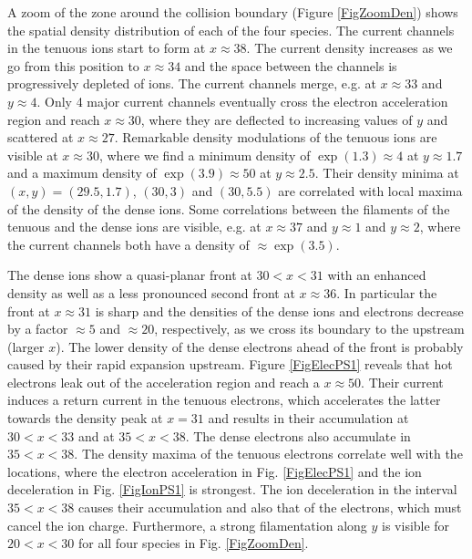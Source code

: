 \documentclass[structabstract]{aa}
\begin{document}
A zoom of the zone around the collision boundary (Figure \ref{FigZoomDen}) 
shows the spatial density distribution of each of the four species. The 
current channels in the tenuous ions start to form at $x\approx 38$. The 
current density increases as we go from this position to $x\approx 34$ and 
the space between the channels is progressively depleted of ions. The current
channels merge, e.g. at $x\approx 33$ and $y \approx 4$. Only 4 major 
current channels eventually cross the electron acceleration region and reach 
$x\approx 30$, where they are deflected to increasing values of $y$ and 
scattered at $x\approx 27$. Remarkable density modulations of the tenuous 
ions are visible at $x\approx 30$, where we find a minimum density of 
$\exp{(1.3)} \approx 4$ at $y\approx 1.7$ and a maximum density of
$\exp{(3.9)} \approx 50$ at $y\approx 2.5$. Their density minima at $(x,y) 
= (29.5,1.7)$, $(30,3)$ and $(30,5.5)$ are correlated with local maxima of 
the density of the dense ions. Some correlations between the filaments of 
the tenuous and the dense ions are visible, e.g. at $x\approx 37$ and 
$y\approx 1$ and $y\approx 2$, where the current channels both have a 
density of $\approx \exp{(3.5)}$. 

The dense ions show a quasi-planar front at $30<x<31$ with an enhanced 
density as well as a less pronounced second front at $x\approx 36$. In 
particular the front at $x\approx 31$ is sharp and the densities of the 
dense ions and electrons decrease by a factor $\approx 5$ and $\approx 20$, 
respectively, as we cross its boundary to the upstream (larger $x$). The 
lower density of the dense electrons ahead of the front is probably caused 
by their rapid expansion upstream. Figure \ref{FigElecPS1} reveals that hot 
electrons leak out of the acceleration region and reach a $x\approx 50$. 
Their current induces a return current in the tenuous electrons, which 
accelerates the latter towards the density peak at $x=31$ and results in 
their accumulation at $30<x<33$ and at $35<x<38$. The dense electrons 
also accumulate in $35<x<38$. The density maxima of the tenuous electrons 
correlate well with the locations, where the electron acceleration in Fig. 
\ref{FigElecPS1} and the ion deceleration in Fig. \ref{FigIonPS1} is 
strongest. The ion deceleration in the interval $35<x<38$ causes their 
accumulation and also that of the electrons, which must cancel the ion 
charge. Furthermore, a strong filamentation along $y$ is visible for 
$20<x<30$ for all four species in Fig. \ref{FigZoomDen}.
\end{document}
